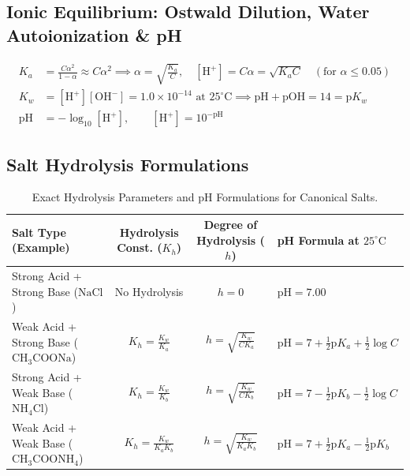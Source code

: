 \documentclass[11pt,a4paper]{article}
\begin{document}
\subsection{Ionic Equilibrium: Ostwald Dilution, Water Autoionization \& pH}

\begin{formulabox}
\begin{align}
  K_a &= \frac{C \alpha^2}{1 - \alpha} \approx C \alpha^2 \implies \alpha = \sqrt{\frac{K_a}{C}}, \quad [\text{H}^+] = C\alpha = \sqrt{K_a C} \quad (\text{for } \alpha \le 0.05) \\
  K_w &= [\text{H}^+][\text{OH}^-] = 1.0\times 10^{-14} \text{ at } 25^\circ\text{C} \implies \text{pH} + \text{pOH} = 14 = \text{p}K_w \\
  \text{pH} &= -\log_{10}[\text{H}^+], \qquad [\text{H}^+] = 10^{-\text{pH}}
\end{align}
\end{formulabox}

\subsection{Salt Hydrolysis Formulations}

\begin{table}[htbp]
\centering
\small
\renewcommand{\arraystretch}{1.3}
\begin{tabularx}{\textwidth}{L c c Y}
\toprule
\textbf{Salt Type (Example)} & \textbf{Hydrolysis Const. ($K_h$)} & \textbf{Degree of Hydrolysis ($h$)} & \textbf{pH Formula at $25^\circ\text{C}$} \\
\midrule
Strong Acid + Strong Base ($\text{NaCl}$) & No Hydrolysis & $h = 0$ & $\text{pH} = 7.00$ \\
Weak Acid + Strong Base ($\text{CH}_3\text{COONa}$) & $K_h = \frac{K_w}{K_a}$ & $h = \sqrt{\frac{K_w}{C K_a}}$ & $\text{pH} = 7 + \frac{1}{2}\text{p}K_a + \frac{1}{2}\log C$ \\
Strong Acid + Weak Base ($\text{NH}_4\text{Cl}$) & $K_h = \frac{K_w}{K_b}$ & $h = \sqrt{\frac{K_w}{C K_b}}$ & $\text{pH} = 7 - \frac{1}{2}\text{p}K_b - \frac{1}{2}\log C$ \\
Weak Acid + Weak Base ($\text{CH}_3\text{COONH}_4$) & $K_h = \frac{K_w}{K_a K_b}$ & $h = \sqrt{\frac{K_w}{K_a K_b}}$ & $\text{pH} = 7 + \frac{1}{2}\text{p}K_a - \frac{1}{2}\text{p}K_b$ \\
\bottomrule
\end{tabularx}
\caption{Exact Hydrolysis Parameters and pH Formulations for Canonical Salts.}
\end{table}
\end{document}
